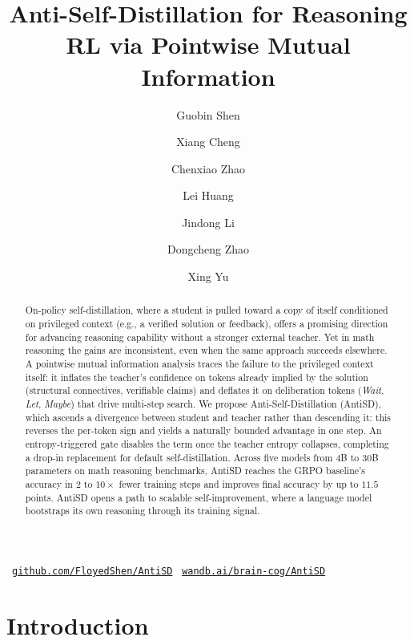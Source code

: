 \documentclass{llmxive}
\title{Anti-Self-Distillation for Reasoning RL via Pointwise Mutual Information}
\author{Guobin Shen \and Xiang Cheng \and Chenxiao Zhao \and Lei Huang \and Jindong Li \and Dongcheng Zhao \and Xing Yu}
\providecommand{\resourcelink}[3]{  #1~\texttt{\href{#3}{#2}}}
\begin{document}
\maketitle
\begin{abstract}
On-policy self-distillation, where a student is pulled toward a copy of itself conditioned on privileged context (e.g., a verified solution or feedback), offers a promising direction for advancing reasoning capability without a stronger external teacher.
  Yet in math reasoning the gains are inconsistent, even when the same approach succeeds elsewhere.
  A pointwise mutual information analysis traces the failure to the privileged context itself: it inflates the teacher's confidence on tokens already implied by the solution (structural connectives, verifiable claims) and deflates it on deliberation tokens (\emph{Wait}, \emph{Let}, \emph{Maybe}) that drive multi-step search.
  We propose Anti-Self-Distillation (AntiSD), which ascends a divergence between student and teacher rather than descending it: this reverses the per-token sign and yields a naturally bounded advantage in one step.
  An entropy-triggered gate disables the term once the teacher entropy collapses, completing a drop-in replacement for default self-distillation.
  Across five models from 4B to 30B parameters on math reasoning benchmarks, AntiSD reaches the GRPO baseline's accuracy in $2$ to $10\times$ fewer training steps and improves final accuracy by up to $11.5$ points.
  AntiSD opens a path to scalable self-improvement, where a language model bootstraps its own reasoning through its training signal.
\end{abstract}


\begin{center}\vspace{-0.6em}\small
  \resourcelink{}{github.com/FloyedShen/AntiSD}{https://github.com/FloyedShen/AntiSD}%
  \hspace{2em}%
  \resourcelink{}{wandb.ai/brain-cog/AntiSD}{https://wandb.ai/brain-cog/AntiSD}
\end{center}

\section{Introduction}
\label{sec:intro}
\vspace{-0.5em}
\end{document}
